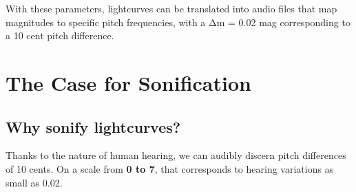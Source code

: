 \documentclass[]{acmsiggraph}
\begin{document}
With these parameters, lightcurves can be translated into audio files that map magnitudes to specific pitch frequencies, with a Δm = 0.02 mag corresponding to a 10 cent pitch difference.




\section{The Case for Sonification}

\subsection{Why sonify lightcurves?}

Thanks to the nature of human hearing, we can audibly discern pitch differences of 10 cents. On a scale from \textbf{0 to 7}, that corresponds to hearing variations as small as 0.02.
\end{document}
